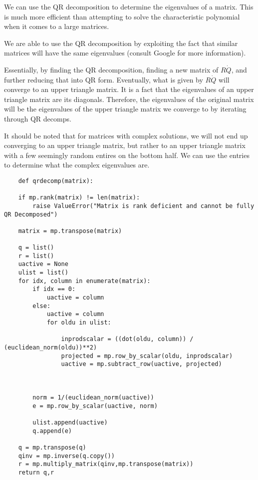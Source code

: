 \documentclass[12pt, a4paper]{article}
\begin{document}
We can use the QR decomposition to determine the eigenvalues of a matrix. This is much more efficient than attempting to solve the characteristic polynomial when it comes to a large matrices. 

We are able to use the QR decomposition by exploiting the fact that similar matrices will have the same eigenvalues (consult Google for more information).

Essentially, by finding the QR decomposition, finding a new matrix of $R\dot Q$, and further reducing that into QR form. Eventually, what is given by $R\dot Q$ will converge to an upper triangle matrix. 
It is a fact that the eigenvalues of an upper triangle matrix are its diagonals. Therefore, the eigenvalues of the original matrix will be the eigenvalues of the upper triangle matrix we converge to by iterating through QR decomps. 

It should be noted that for matrices with complex solutions, we will not end up converging to an upper triangle matrix, but rather to an upper triangle matrix with a few seemingly random entires on the bottom half. 
We can use the entries to determine what the complex eigenvalues are. 

\begin{lstlisting}
    def qrdecomp(matrix):

    if mp.rank(matrix) != len(matrix):
        raise ValueError("Matrix is rank deficient and cannot be fully QR Decomposed")
    
    matrix = mp.transpose(matrix)

    q = list()
    r = list()
    uactive = None
    ulist = list()
    for idx, column in enumerate(matrix):
        if idx == 0:
            uactive = column
        else:
            uactive = column
            for oldu in ulist:

                inprodscalar = ((dot(oldu, column)) / (euclidean_norm(oldu))**2)
                projected = mp.row_by_scalar(oldu, inprodscalar)
                uactive = mp.subtract_row(uactive, projected)

        

        norm = 1/(euclidean_norm(uactive))
        e = mp.row_by_scalar(uactive, norm)

        ulist.append(uactive)
        q.append(e)

    q = mp.transpose(q)
    qinv = mp.inverse(q.copy())
    r = mp.multiply_matrix(qinv,mp.transpose(matrix))
    return q,r 

\end{lstlisting}
\end{document}
